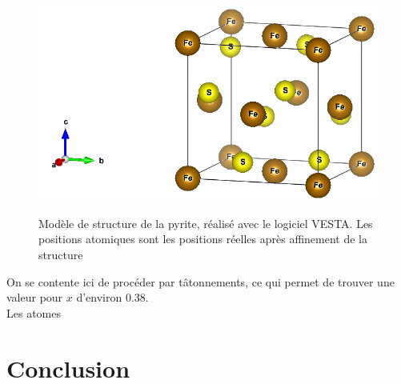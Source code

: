 \begin{figure}
\caption{Modèle de structure de la pyrite, réalisé avec le logiciel VESTA. Les positions atomiques sont les positions réelles après affinement de la structure}
\includegraphics[width=\columnwidth]{figures/model_VESTA_FeS2}
\label{fig:VestaModel}
\end{figure}

On se contente ici de procéder par tâtonnements, ce qui permet de trouver une valeur pour \(x\) d'environ \num{0.38}.\\
Les atomes 

\section{Conclusion}


